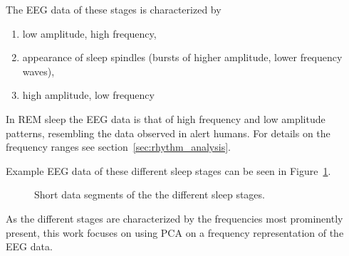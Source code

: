 \newpage
The EEG data of these stages is characterized by

\begin{enumerate}[label={S\arabic*:}]
	\item low amplitude, high frequency,
	\item appearance of sleep spindles (bursts of higher amplitude, lower frequency waves),
	\item high amplitude, low frequency
\end{enumerate}

In REM sleep the EEG data is that of high frequency and low amplitude patterns, resembling the data observed in alert humans. For details on the frequency ranges see section~\ref{sec:rhythm_analysis}.

Example EEG data of these different sleep stages can be seen in Figure~\ref{fig:different_sleep_stages}.

\vspace{0.5cm}
\begin{figure}[h]
	\centering

	\begin{subfigure}[b]{\textwidth}
	\end{subfigure}
	
	\caption{Short data segments of the the different sleep stages.}
	\label{fig:different_sleep_stages}
\end{figure}

As the different stages are characterized by the frequencies most prominently present, this work focuses on using PCA on a frequency representation of the EEG data.